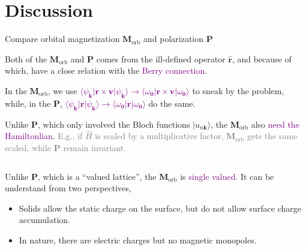\documentclass{beamer}
\newcommand{\purple}{\textcolor{purple}}
\begin{document}
    \section{Discussion}

    \begin{frame}{Compare orbital magnetization \(\bm{M}_{\text{orb}}\) and polarization \(\bm{P}\)}\small
      \begin{block}{}
        Both of the \(\bm{M}_{\text{orb}}\) and \(\bm{P}\) comes from the ill-defined operator \(\widehat{\bm{r}}\), and because of which, have a close relation with the \purple{Berry connection}.
      \end{block}
      \begin{block}{}
        In the \(\bm{M}_{\text{orb}}\), we use \purple{\(\langle\psi_{\bm{k}}|\bm{r}\times\bm{v}|\psi_{\bm{k}}\rangle \to \langle\omega_{\bm{0}}|\bm{r}\times\bm{v}|\omega_{\bm{0}}\rangle\)} to sneak by the problem, while, in the \(\bm{P}\), \purple{\(\langle\psi_{\bm{k}}|\bm{r}|\psi_{\bm{k}}\rangle \to \langle\omega_{\bm{0}}|\bm{r}|\omega_{\bm{0}}\rangle\)} do the same.
      \end{block}
      \begin{block}{}
        Unlike \(\bm{P}\), which only involved the Bloch functions \(|u_{n\bm{k}}\rangle\), the \(\bm{M}_{\text{orb}}\) also \purple{need the Hamiltonlian}. \textcolor{gray}{E.g., if \(\widehat{H}\) is scaled by a multiplicative factor, \(\bm{M}_{\text{orb}}\) gets the same scaled, while \(\bm{P}\) remain invariant.}
      \end{block}
      \begin{columns}
        \begin{column}{0.68\textwidth}
          \begin{block}{}
            Unlike \(\bm{P}\), which is a ``valued lattice'', the \(\bm{M}_{\text{orb}}\) is \purple{single valued}. It can be understand from two perspectives,
            \begin{itemize}
              \item Solids allow the static charge on the surface, but do not allow surface charge accumulation.
              \item In nature, there are electric charges but no magnetic monopoles.
            \end{itemize}
          \end{block}
        \end{column}

\end{columns}
\end{frame}
\end{document}
